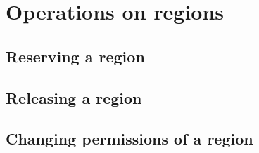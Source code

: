 \section{Operations on regions}

%
%

\subsection{Reserving a region}

%
%

\subsection{Releasing a region}

%
%

\subsection{Changing permissions of a region}
